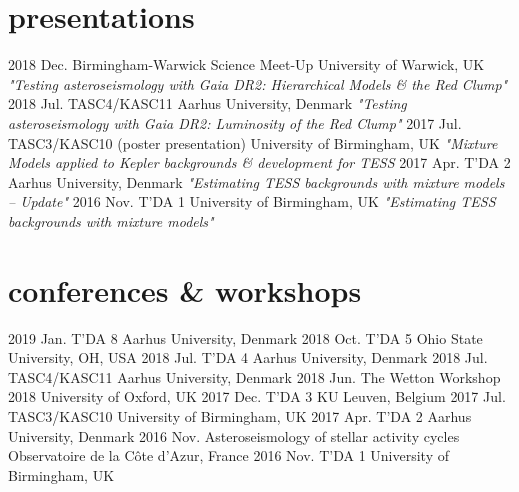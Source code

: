 \documentclass[]{k-cv} %
\begin{document}
\section{presentations}

\begin{entrylist}
\entry
{2018 Dec.}
{Birmingham-Warwick Science Meet-Up}
{University of Warwick, UK}
{\emph{"Testing asteroseismology with \textit{Gaia} DR2: Hierarchical Models \& the Red Clump"}}
\entry
{2018 Jul.}
{TASC4/KASC11}
{Aarhus University, Denmark}
{\emph{"Testing asteroseismology with \textit{Gaia} DR2: Luminosity of the Red Clump"}}
\entry
{2017 Jul.}
{TASC3/KASC10 (poster presentation)}
{University of Birmingham, UK}
{\emph{"Mixture Models applied to \emph{Kepler} backgrounds \& development for TESS}}
\entry
{2017 Apr.}
{T'DA 2}
{Aarhus University, Denmark}
{\emph{"Estimating TESS backgrounds with mixture models -- Update"}}
\entry
{2016 Nov.}
{T'DA 1}
{University of Birmingham, UK}
{\emph{"Estimating TESS backgrounds with mixture models"}}
\end{entrylist}

\section{conferences \& workshops}

\begin{entrylist}
\entrythree
{2019 Jan.}
{T'DA 8}
{Aarhus University, Denmark}
\entrythree
{2018 Oct.}
{T'DA 5}
{Ohio State University, OH, USA}
\entrythree
{2018 Jul.}
{T'DA 4}
{Aarhus University, Denmark}
\entrythree
{2018 Jul.}
{TASC4/KASC11}
{Aarhus University, Denmark}
\entrythree
{2018 Jun.}
{The Wetton Workshop 2018}
{University of Oxford, UK}
\entrythree
{2017 Dec.}
{T'DA 3}
{KU Leuven, Belgium}
\entrythree
{2017 Jul.}
{TASC3/KASC10}
{University of Birmingham, UK}
\entrythree
{2017 Apr.}
{T'DA 2}
{Aarhus University, Denmark}
\entrythree
{2016 Nov.}
{Asteroseismology of stellar activity cycles}
{Observatoire de la C\^{o}te d'Azur, France}
\entrythree
{2016 Nov.}
{T'DA 1}
{University of Birmingham, UK}
\end{entrylist}
\end{document}
